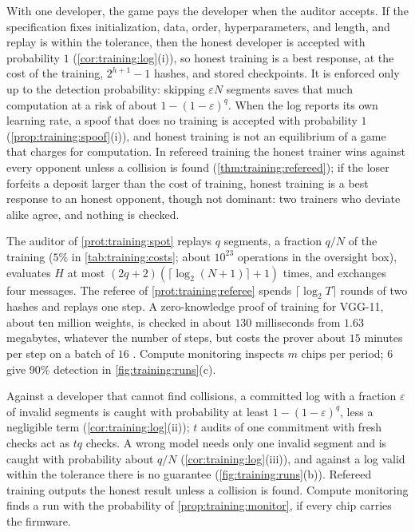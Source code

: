 \begin{refsection}
\questionone With one developer, the game pays the developer when the auditor accepts. If the specification fixes initialization, data, order, hyperparameters, and length, and replay is within the tolerance, then the honest developer is accepted with probability $1$ (\cref{cor:training:log}(i)), so honest training is a best response, at the cost of the training, $2^{h+1}-1$ hashes, and stored checkpoints. It is enforced only up to the detection probability: skipping $\varepsilon N$ segments saves that much computation at a risk of about $1-(1-\varepsilon)^q$. When the log reports its own learning rate, a spoof that does no training is accepted with probability $1$ (\cref{prop:training:spoof}(i)), and honest training is not an equilibrium of a game that charges for computation. In refereed training the honest trainer wins against every opponent unless a collision is found (\cref{thm:training:refereed}); if the loser forfeits a deposit larger than the cost of training, honest training is a best response to an honest opponent, though not dominant: two trainers who deviate alike agree, and nothing is checked.

\questiontwo The auditor of \cref{prot:training:spot} replays $q$ segments, a fraction $q/N$ of the training ($5\%$ in \cref{tab:training:costs}; about $10^{23}$ operations in the oversight box), evaluates $H$ at most $(2q+2)(\lceil\log_2(N+1)\rceil+1)$ times, and exchanges four messages. The referee of \cref{prot:training:referee} spends $\lceil\log_2T\rceil$ rounds of two hashes and replays one step. A zero-knowledge proof of training for VGG-11, about ten million weights, is checked in about $130$ milliseconds from $1.63$ megabytes, whatever the number of steps, but costs the prover about $15$ minutes per step on a batch of $16$ \parencite{AbbaszadehEtAl2024}. Compute monitoring inspects $m$ chips per period; $6$ give $90\%$ detection in \cref{fig:training:runs}(c).

\questionthree Against a developer that cannot find collisions, a committed log with a fraction $\varepsilon$ of invalid segments is caught with probability at least $1-(1-\varepsilon)^q$, less a negligible term (\cref{cor:training:log}(ii)); $t$ audits of one commitment with fresh checks act as $tq$ checks. A wrong model needs only one invalid segment and is caught with probability about $q/N$ (\cref{cor:training:log}(iii)), and against a log valid within the tolerance there is no guarantee (\cref{fig:training:runs}(b)). Refereed training outputs the honest result unless a collision is found. Compute monitoring finds a run with the probability of \cref{prop:training:monitor}, if every chip carries the firmware.


\end{refsection}
